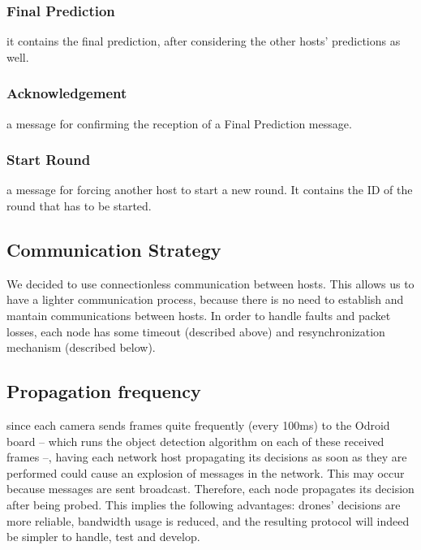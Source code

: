 \documentclass[10pt,conference,compsocconf]{IEEEtran}
\begin{document}
\subsubsection{Final Prediction} it contains the final prediction, after considering the other hosts' predictions as well.
\subsubsection{Acknowledgement} a message for confirming the reception of a Final Prediction message.
\subsubsection{Start Round} a message for forcing another host to start a new round. It contains the ID of the round that has to be started.
\subsection{Communication Strategy}We decided to use connectionless communication between hosts. This allows us to have a lighter communication process, because there is no need to establish and mantain communications between hosts. In order to handle faults and packet losses, each node has some timeout (described above) and resynchronization mechanism (described below).
\subsection{Propagation frequency}since each camera sends frames quite frequently (every 100ms) to the Odroid board -- which runs the object detection algorithm on each of these received frames --, having each network host propagating its decisions as soon as they are performed could cause an explosion of messages in the network. This may occur because messages are sent broadcast. Therefore, each node propagates its decision after being probed. This implies the following advantages: drones' decisions are more reliable, bandwidth usage is reduced, and the resulting protocol will indeed be simpler to handle, test and develop.
\end{document}
